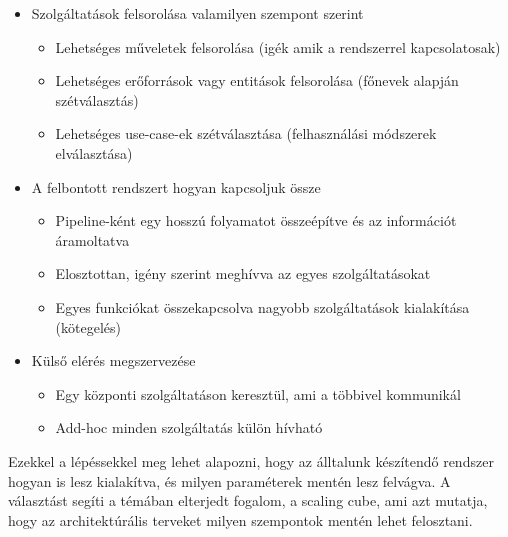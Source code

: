 \documentclass[11pt,magyar,a4paper,oneside,]{report}
\providecommand{\tightlist}{%
  \setlength{\itemsep}{0pt}\setlength{\parskip}{0pt}}
\begin{document}
\begin{itemize}
\tightlist
\item
  Szolgáltatások felsorolása valamilyen szempont szerint

  \begin{itemize}
  \tightlist
  \item
    Lehetséges műveletek felsorolása (igék amik a rendszerrel
    kapcsolatosak)
  \item
    Lehetséges erőforrások vagy entitások felsorolása (főnevek alapján
    szétválasztás)
  \item
    Lehetséges use-case-ek szétválasztása (felhasználási módszerek
    elválasztása)
  \end{itemize}
\item
  A felbontott rendszert hogyan kapcsoljuk össze

  \begin{itemize}
  \tightlist
  \item
    Pipeline-ként egy hosszú folyamatot összeépítve és az információt
    áramoltatva
  \item
    Elosztottan, igény szerint meghívva az egyes szolgáltatásokat
  \item
    Egyes funkciókat összekapcsolva nagyobb szolgáltatások kialakítása
    (kötegelés)
  \end{itemize}
\item
  Külső elérés megszervezése

  \begin{itemize}
  \tightlist
  \item
    Egy központi szolgáltatáson keresztül, ami a többivel kommunikál
  \item
    Add-hoc minden szolgáltatás külön hívható
  \end{itemize}
\end{itemize}

Ezekkel a lépéssekkel meg lehet alapozni, hogy az álltalunk készítendő
rendszer hogyan is lesz kialakítva, és milyen paraméterek mentén lesz
felvágva. A választást segíti a témában elterjedt fogalom, a scaling
cube\citep{scale-cube}, ami azt mutatja, hogy az architektúrális
terveket milyen szempontok mentén lehet felosztani.
\end{document}
